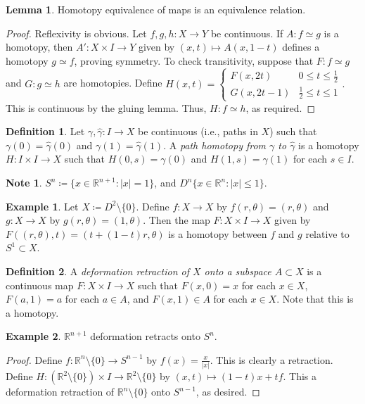 \documentclass[10pt,letterpaper,cm]{nupset}
\theoremstyle{definition}
\newtheorem*{definition}{Definition}
\newtheorem{exmp}{Example}
\newtheorem{note}{Note}
\newtheorem{lemma}{Lemma}
\newcommand{\R}{\mathbb R}
\newcommand{\1}{\mathbf{1}}
\newcommand{\0}{\vec 0}
\begin{document}
\begin{lemma}
Homotopy equivalence of maps is an equivalence relation.
\end{lemma}
\begin{proof}
Reflexivity is obvious.  Let $f, g, h : X \to Y$ be continuous. If $A: f \simeq g$ is a homotopy, then $A' : X \times I \to Y$ given by $(x,t) \mapsto A(x, 1-t)$ defines a homotopy $g\simeq f$, proving symmetry. To check transitivity, suppose that $F : f \simeq g$ and $G: g\simeq h$ are homotopies. Define $H(x,t) = \begin{cases}
F(x, 2t) & 0 \leq t \leq \frac{1}{2}
\\ G(x, 2t-1) & \frac{1}{2} \leq t \leq 1
\end{cases}.$ This is continuous by the gluing lemma. Thus, $H : f \simeq h$, as required. 
\end{proof}

\begin{definition}
Let $\gamma, \hat{\gamma}: I \to X$ be continuous (i.e., paths in $X$) such that $\gamma(0) = \hat{\gamma}(0)$ and $\gamma(1) = \hat{\gamma}(1)$.  A \textit{path homotopy from $\gamma$ to $\hat{\gamma}$} is a homotopy $H: I \times I \to X$ such that $H(0,s) = \gamma(0)$ and $H(1,s) = \gamma(1)$ for each $s\in I$.
\end{definition}

\begin{note}
$S^n \coloneqq \{x\in \R^{n+1} : |x| =1\}$, and $D^n \{x\in \R^n : |x|\leq 1\}$.
\end{note}

\begin{exmp}
Let $X\coloneqq D^2 \setminus \{0\}$. Define $f: X \to X$ by $f(r, \theta) = (r, \theta)$ and $g: X \to X$ by $g(r, \theta) = (1, \theta)$. Then the map $F: X \times I \to X$ given by  $F((r, \theta), t)=  (t+ (1-t)r, \theta)$ is a homotopy between $f$ and $g$ relative to $S^1\subset X$.
\end{exmp}

\begin{definition}
A \textit{deformation retraction of $X$ onto a subspace $A\subset X$} is a continuous map $F: X \times I \to X$ such that $F(x, 0) = x$ for each $x\in X$, $F(a, 1) = a$ for each $a\in A$, and $F(x, 1) \in A$ for each $x\in X$. Note that this is a homotopy. 
\end{definition}

\begin{exmp}  $\R^{n+1}$ deformation retracts onto $S^n$. 
\end{exmp}
\begin{proof}
Define $f: \R^n \setminus \{0\} \to S^{n-1}$ by $f(x) = \frac{x}{|x|}$. This is clearly a retraction. Define $H : (\R^2 \setminus \{0\}) \times I \to \R^2 \setminus \{0\}$ by $(x, t) \mapsto (1-t)x +tf$. This a deformation retraction of $ \R^n \setminus \{0\}$ onto $S^{n-1}$, as desired. 
\end{proof}
\end{document}
